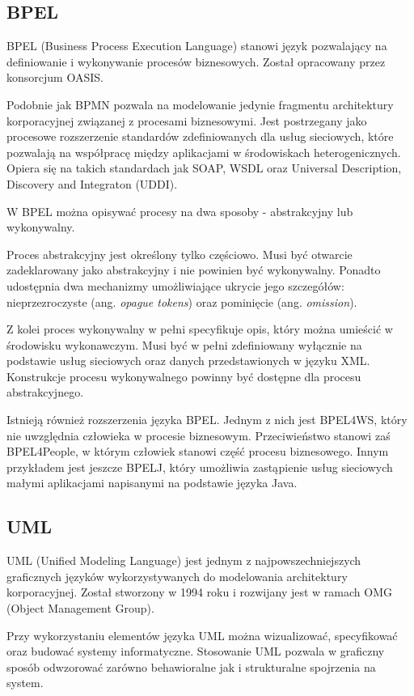 \subsection{BPEL}
BPEL (Business Process Execution Language) stanowi język pozwalający na definiowanie i wykonywanie procesów biznesowych. Został opracowany przez konsorcjum OASIS.

Podobnie jak BPMN pozwala na modelowanie jedynie fragmentu architektury korporacyjnej związanej z procesami biznesowymi. Jest postrzegany jako procesowe rozszerzenie standardów zdefiniowanych dla usług sieciowych, które pozwalają na współpracę między aplikacjami w środowiskach heterogenicznych. Opiera się na takich standardach jak SOAP, WSDL oraz Universal Description, Discovery and Integraton (UDDI). 

W BPEL można opisywać procesy na dwa sposoby - abstrakcyjny lub wykonywalny.

Proces abstrakcyjny jest określony tylko częściowo. Musi być otwarcie zadeklarowany jako abstrakcyjny i nie powinien być wykonywalny. Ponadto  udostępnia dwa mechanizmy umożliwiające ukrycie jego szczegółów: nieprzezroczyste (ang. \emph{opague tokens}) oraz pominięcie (ang. \emph{omission}).

Z kolei proces wykonywalny w pełni specyfikuje opis, który można umieścić w środowisku wykonawczym. Musi być w pełni zdefiniowany wyłącznie na podstawie usług sieciowych oraz danych przedstawionych w języku XML. Konstrukcje procesu wykonywalnego powinny być dostępne dla procesu abstrakcyjnego. 

Istnieją również rozszerzenia języka BPEL. Jednym z nich jest BPEL4WS, który nie uwzględnia człowieka w procesie biznesowym. Przeciwieństwo stanowi zaś BPEL4People, w którym człowiek stanowi część procesu biznesowego. Innym przykładem jest jeszcze BPELJ, który umożliwia zastąpienie usług sieciowych małymi aplikacjami napisanymi na podstawie języka Java.\cite{PlatIntGor}

\subsection{UML}
UML (Unified Modeling Language) jest jednym z najpowszechniejszych graficznych języków wykorzystywanych do modelowania architektury korporacyjnej. Został stworzony w 1994 roku i rozwijany jest w ramach OMG (Object Management Group). 

Przy wykorzystaniu elementów języka UML można wizualizować, specyfikować oraz budować systemy informatyczne. Stosowanie UML pozwala w graficzny sposób odwzorować zarówno behawioralne jak i strukturalne spojrzenia na system.

